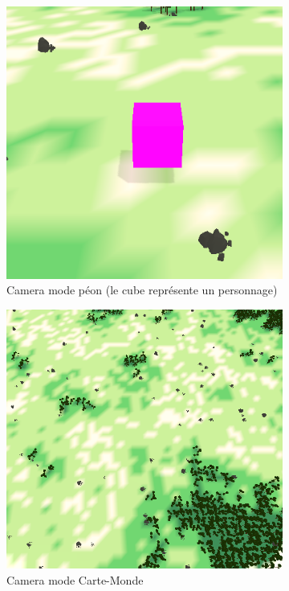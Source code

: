 \begin{figure}[!h]
    \centering
    \begin{subfigure}{0.39\linewidth}
        \centering
        \includegraphics[width=\linewidth]{images/camera_peon.png}
        \caption{Camera mode péon (le cube représente un personnage)}
        \label{fig:image_avant_expansion}
    \end{subfigure}
    \hfill
    \begin{subfigure}{0.4\linewidth}
        \centering
        \includegraphics[width=\linewidth]{images/camera_seigneur.png}
        \caption{Camera mode Carte-Monde }
        \label{fig:histo_avant_expansion}
    \end{subfigure}
    \caption{}
\end{figure}

